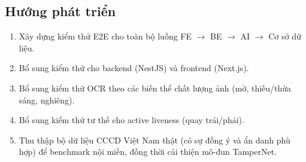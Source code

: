 \documentclass[12pt,a4paper]{article}
\begin{document}
\subsection{Hướng phát triển}\label{sec:future}
\begin{enumerate}[label=\arabic*.]
  \item Xây dựng kiểm thử E2E cho toàn bộ luồng FE $\rightarrow$ BE $\rightarrow$ AI $\rightarrow$ Cơ sở dữ liệu.
  \item Bổ sung kiểm thử cho backend (NestJS) và frontend (Next.js).
  \item Bổ sung kiểm thử OCR theo các biến thể chất lượng ảnh (mờ, thiếu/thừa sáng, nghiêng).
  \item Bổ sung kiểm thử tư thế cho active liveness (quay trái/phải).
  \item Thu thập bộ dữ liệu CCCD Việt Nam thật (có sự đồng ý và ẩn danh phù hợp) để benchmark nội miền,
        đồng thời cải thiện mô-đun TamperNet.
\end{enumerate}
\end{document}
